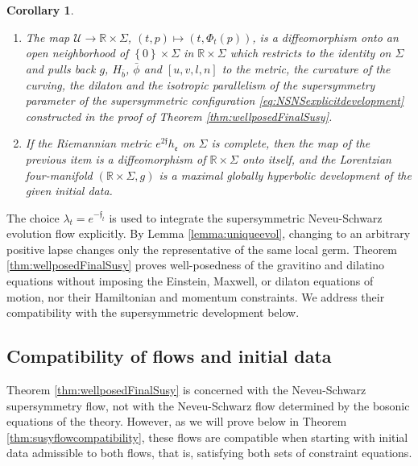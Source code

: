 \documentclass[10pt,reqno,a4paper]{amsart}
\theoremstyle{plain}
\newtheorem{cor}[thm]{Corollary}
\theoremstyle{definition}
\theoremstyle{remark}
\theoremstyle{remark}
\def\cU{\mathcal{U}}
\def\fre{\mathfrak{e}}
\renewcommand{\(}{ (}
\renewcommand{\)}{ )}
\newcommand{\frf}{\mathfrak{f}}
\begin{document}
\begin{cor}
\begin{enumerate}
\item The map $\cU\to\mathbb{R}\times\Sigma$, $(t,p)\mapsto (t,\Phi_t(p))$, is a diffeomorphism onto an open neighborhood of $\left\{ 0 \right\} \times \Sigma$ in $\mathbb{R}\times\Sigma$ which restricts to the identity on $\Sigma$ and pulls back $g$, $H_{\bar{b}}$, $\bar{\phi}$ and $[u,v,l,n]$ to the metric, the curvature of the curving, the dilaton and the isotropic parallelism of the supersymmetry parameter of the supersymmetric configuration \eqref{eq:NSNSexplicitdevelopment} constructed in the proof of Theorem \ref{thm:wellposedFinalSusy}.

\item If the Riemannian metric $e^{2\frf}h_{\fre}$ on $\Sigma$ is complete, then the map of the previous item is a diffeomorphism of $\mathbb{R}\times\Sigma$ onto itself, and the Lorentzian four-manifold $(\mathbb{R}\times\Sigma , g)$ is a maximal globally hyperbolic development of the given initial data.
\end{enumerate}
\end{cor} 

\noindent
The choice $\lambda_t=e^{-\frf_t}$ is used to integrate the supersymmetric Neveu-Schwarz evolution flow explicitly.  By Lemma \ref{lemma:uniqueevol}, changing to an arbitrary positive lapse changes only the representative of the same local germ.  Theorem \ref{thm:wellposedFinalSusy} proves well-posedness of the gravitino and dilatino equations without imposing the Einstein, Maxwell, or dilaton equations of motion, nor their Hamiltonian and momentum constraints. We address their compatibility with the supersymmetric development below.
 


%

\subsection{Compatibility of flows and initial data}
\label{sec:compatibleinitialdata}

%

Theorem \ref{thm:wellposedFinalSusy} is concerned with the Neveu-Schwarz supersymmetry flow, not with the Neveu-Schwarz flow determined by the bosonic equations of the theory. However, as we will prove below in Theorem \ref{thm:susyflowcompatibility}, these flows are compatible when starting with initial data admissible to both flows, that is, satisfying both sets of constraint equations.  
\end{document}
